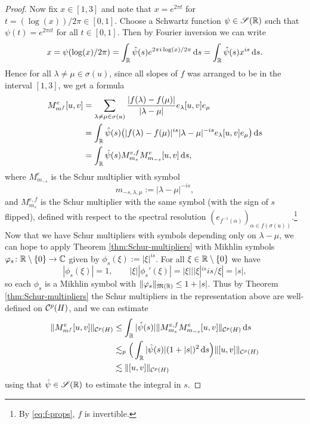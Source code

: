 \begin{proof}
  Now fix $x \in [1,3]$ and note that $x = e^{2\pi t}$ for $t = (\log(x))/2\pi \in [0,1]$.
  Choose a Schwartz function $\psi \in \mathscr{S}(\mathbb{R})$ such that $\psi(t) = e^{2\pi i t}$ for all $t \in [0,1]$.
  Then by Fourier inversion we can write
  \begin{equation*}
    x = \psi(\log(x)/2\pi) = \int_{\mathbb{R}} \hat{\psi}(s) e^{2\pi i \log(x)/2\pi} \, \mathrm{d} s = \int_{\mathbb{R}} \hat{\psi}(s) x^{is} \, \mathrm{d} s.
  \end{equation*}
  Hence for all $\lambda \neq \mu \in \sigma(u)$, since all slopes of $f$ was arranged to be in the interval $[1,3]$, we get a formula
  \begin{equation*}
    \begin{aligned}
      M^{e}_{m^f} [u,v]
      &= \sum_{\lambda \neq \mu \in \sigma(u)} \frac{|f(\lambda)-f(\mu)|}{|\lambda - \mu|} e_{\lambda} [u,v] e_{\mu} \\
      &= \int_{\mathbb{R}} \hat{\psi}(s) \big( |f(\lambda) - f(\mu)|^{is} |\lambda - \mu|^{-is} e_{\lambda} [u,v] e_{\mu} \big) \, \mathrm{d} s \\
      &= \int_{\mathbb{R}} \hat{\psi}(s) M^{e,f}_{m_{s}} M^{e}_{m_{-s}} [u,v] \, \mathrm{d} s,
    \end{aligned}
  \end{equation*}
  where $M_{m_{-s}}^{e}$ is the Schur multiplier with symbol
  \begin{equation*}
    m_{-s,\lambda,\mu} := |\lambda - \mu|^{-is},
  \end{equation*}
  and $M^{e,f}_{m_{s}}$ is the Schur multiplier with the same symbol (with the sign of $s$ flipped), defined with respect to the spectral resolution $(e_{f^{-1}(\alpha)})_{\alpha \in f(\sigma(u))}$.\footnote{By \eqref{eq:f-props}, $f$ is invertible.}
  Now that we have Schur multipliers with symbols depending only on $\lambda - \mu$, we can hope to apply Theorem \ref{thm:Schur-multipliers} with Mikhlin symbols $\varphi_{s} \colon \mathbb{R} \setminus \{0\} \rightarrow \mathbb{C}$ given by $\phi_{s}(\xi) := |\xi|^{is}$.
  For all $\xi \in \mathbb{R} \setminus \{0\}$ we have
  \begin{equation*}
    |\phi_{s}(\xi)| = 1, \qquad |\xi| |\phi_{s}'(\xi)| = |\xi| ||\xi|^{is} is/\xi| = |s|, 
  \end{equation*}
  so each $\phi_{s}$ is a Mikhlin symbol with $\|\varphi_{s}\|_{\mathfrak{M}(\mathbb{R})} \leq 1 + |s|$.
  Thus by Theorem \ref{thm:Schur-multipliers} the Schur multipliers in the representation above are well-defined on $\mathcal{C}^{p}(H)$, and we can estimate
  \begin{equation*}
    \begin{aligned}
      \|M^{e}_{m^f} [u,v]\|_{\mathcal{C}^{p}(H)}
      &\leq \int_{\mathbb{R}} |\hat{\psi}(s)| \|M^{e,f}_{m_{s}} M^{e}_{m_{-s}} [u,v]\|_{\mathcal{C}^{p}(H)} \, \mathrm{d} s \\
      &\lesssim_{p} \Big( \int_{\mathbb{R}} |\hat{\psi}(s)| (1 + |s|)^{2} \, \mathrm{d} s \Big) \|[u,v]\|_{\mathcal{C}^{p}(H)}  \\
      &\lesssim  \|[u,v]\|_{\mathcal{C}^{p}(H)}
    \end{aligned}
  \end{equation*}
  using that $\hat{\psi} \in \mathscr{S}(\mathbb{R})$ to estimate the integral in $s$.
\end{proof}

